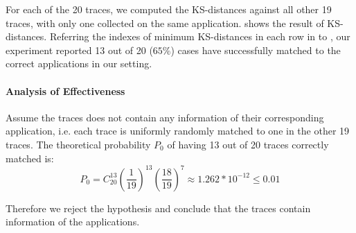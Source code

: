 For each of the 20 traces, we computed the KS-distances against all other 19 traces, with only one collected on the same application.  shows the result of KS-distances. Referring the indexes of minimum KS-distances in each row in  to , our experiment reported 13 out of 20 ($65$\%) cases have successfully matched to the correct applications in our setting.

\paragraph{Analysis of Effectiveness}

Assume the traces does not contain any information of their corresponding application, i.e. each trace is uniformly randomly matched to one in the other 19 traces. The theoretical probability $P_0$ of having 13 out of 20 traces correctly matched is:
\begin{equation*}
P_0 = C^{13}_{20} (\frac{1}{19})^{13} (\frac{18}{19})^{7} \approx 1.262 * 10^{-12} \leq 0.01
\end{equation*}

Therefore we reject the hypothesis and conclude that the traces contain information of the applications.